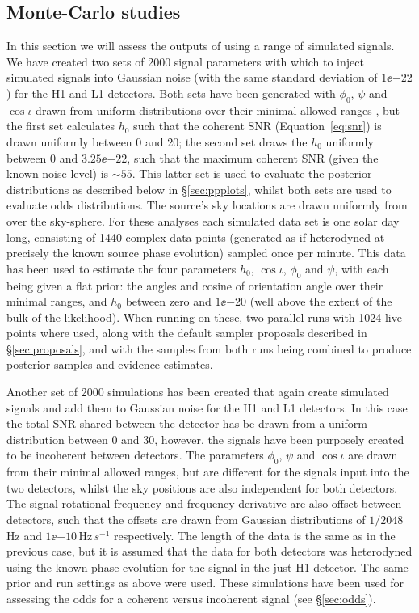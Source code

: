 \subsection{Monte-Carlo studies}

In this section we will assess the outputs of \lppen using a range of simulated signals. We have created two sets of 2000 signal parameters with which to
inject simulated signals into Gaussian noise (with the same standard deviation of $1\ee{-22}$) for the H1 and L1 detectors. Both sets have been generated
with $\phi_0$, $\psi$ and $\cos{\iota}$ drawn from uniform distributions over their minimal allowed ranges \citep[Table~1 of][]{2015MNRAS.453.4399P},
but the first set
calculates $h_0$ such that the coherent SNR (Equation~\ref{eq:snr}) is drawn uniformly between 0 and 20; the second set draws the $h_0$ uniformly between
0 and $3.25\ee{-22}$, such that the maximum coherent SNR (given the known noise level) is $\sim 55$. This latter set is used to evaluate the posterior
distributions as described below in \S\ref{sec:ppplots}, whilst both sets are used to evaluate odds distributions. The source's sky locations are drawn
uniformly from over the sky-sphere. For these analyses each
simulated data set is one solar day long, consisting of 1440 complex data points (generated as if heterodyned at precisely the known source phase evolution)
sampled once per minute. This data has been used to estimate the four parameters $h_0$, $\cos{\iota}$, $\phi_0$ and $\psi$, with each being given
a flat prior: the angles and cosine of orientation angle over their minimal ranges, and $h_0$ between zero and $1\ee{-20}$ (well above the extent of the
bulk of the likelihood). When running \lppen on these, two parallel runs with 1024 live points where used, along with the default sampler proposals described
in \S\ref{sec:proposals}, and with the samples from both runs being combined to produce posterior samples and evidence estimates.

Another set of 2000 simulations has been created that again create simulated signals and add them to Gaussian noise for the H1 and L1 detectors. In this
case the total SNR shared between the detector has be drawn from a uniform distribution between 0 and 30, however, the signals have been purposely created
to be incoherent between detectors. The parameters $\phi_0$, $\psi$ and $\cos{\iota}$ are drawn from their minimal allowed ranges, but are different for
the signals input into the two detectors, whilst the sky positions are also independent for both detectors. The signal rotational frequency and frequency
derivative are also offset between detectors, such that the offsets are drawn from Gaussian distributions of $1/2048$\,Hz and $1\ee{-10}$\,Hz$\,s^{-1}$
respectively. The length of the data is the same as in the previous case, but it is assumed that the data for both detectors was heterodyned using the
known phase evolution for the signal in the just H1 detector. The same prior and run settings as above were used. These simulations have been used for
assessing the odds for a coherent versus incoherent signal (see \S\ref{sec:odds}).


